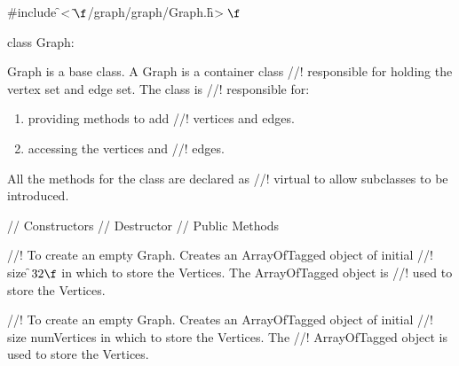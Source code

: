 
\indent \#include \f$<\tilde{ }\f$/graph/graph/Graph.h\f$>\f$

\indent class Graph:


\indent Graph is a base class. A Graph is a container class
//! responsible for holding the vertex set and edge set. The class is
//! responsible for: \begin{enumerate} \item providing methods to add
//! vertices and edges. \item accessing the vertices and
//! edges. \end{enumerate} All the methods for the class are declared as
//! virtual to allow subclasses to be introduced.



\indent\indent // Constructors
\indent{}
\indent{}
\indent{}
\indent\indent // Destructor
\indent{}
\indent\indent // Public Methods
\indent{}
\indent{} 
\indent{}
\indent{}
\indent{}
\indent{}
\indent{}
\indent{}
\indent{}

//! To create an empty Graph. Creates an ArrayOfTagged object of initial
//! size \f$32\f$ in which to store the Vertices. The ArrayOfTagged object is
//! used to store the Vertices.

//! To create an empty Graph. Creates an ArrayOfTagged object of initial
//! size \p numVertices in which to store the Vertices. The
//! ArrayOfTagged object is used to store the Vertices. 

